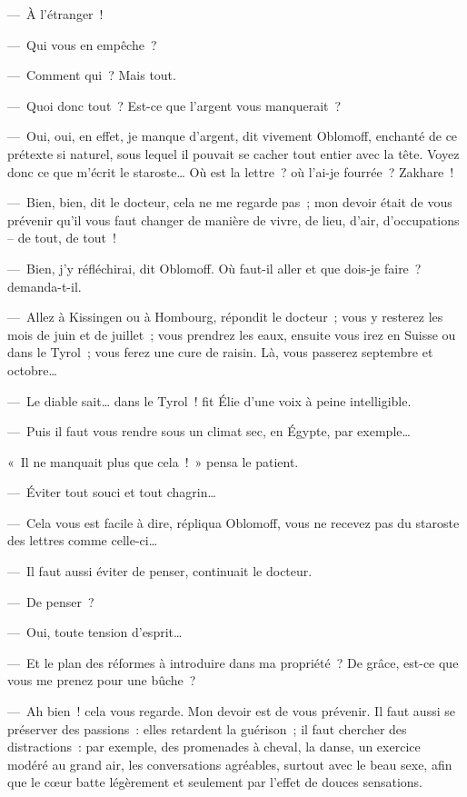 \documentclass[french,twoside]{book} %
\begin{document}
— À l’étranger !\par
— Qui vous en empêche ?\par
— Comment qui ? Mais tout.\par
— Quoi donc tout ? Est-ce que l’argent vous manquerait ?\par
— Oui, oui, en effet, je manque d’argent, dit vivement Oblomoff, enchanté de ce prétexte si naturel, sous lequel il pouvait se cacher tout entier avec la tête. Voyez donc ce que m’écrit le staroste… Où est la lettre ? où l’ai-je fourrée ? Zakhare !\par
— Bien, bien, dit le docteur, cela ne me regarde pas ; mon devoir était de vous prévenir qu’il vous faut changer de manière de vivre, de lieu, d’air, d’occupations – de tout, de tout !\par
— Bien, j’y réfléchirai, dit Oblomoff. Où faut-il aller et que dois-je faire ? demanda-t-il.\par
— Allez à Kissingen ou à Hombourg, répondit le docteur ; vous y resterez les mois de juin et de juillet ; vous prendrez les eaux, ensuite vous irez en Suisse ou dans le Tyrol ; vous ferez une cure de raisin. Là, vous passerez septembre et octobre…\par
— Le diable sait… dans le Tyrol ! fit Élie d’une voix à peine intelligible.\par
— Puis il faut vous rendre sous un climat sec, en Égypte, par exemple…\par
« Il ne manquait plus que cela ! » pensa le patient.\par
— Éviter tout souci et tout chagrin…\par
— Cela vous est facile à dire, répliqua Oblomoff, vous ne recevez pas du staroste des lettres comme celle-ci…\par
— Il faut aussi éviter de penser, continuait le docteur.\par
— De penser ?\par
— Oui, toute tension d’esprit…\par
— Et le plan des réformes à introduire dans ma propriété ? De grâce, est-ce que vous me prenez pour une bûche ?\par
— Ah bien ! cela vous regarde. Mon devoir est de vous prévenir. Il faut aussi se préserver des passions : elles retardent la guérison ; il faut chercher des distractions : par exemple, des promenades à cheval, la danse, un exercice modéré au grand air, les conversations agréables, surtout avec le beau sexe, afin que le cœur batte légèrement et seulement par l’effet de douces sensations.\par
\end{document}
